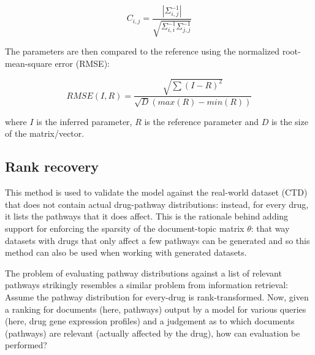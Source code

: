 \documentclass[12pt,a4paper,twoside,openright]{report}
\begin{document}
\begin{equation}
C_{i, j} = \frac{|\Sigma^{-1}_{i, j}|}{\sqrt{\Sigma^{-1}_{i, i}\Sigma^{-1}_{j, j}}}
\end{equation}

The parameters are then compared to the reference using the normalized root-mean-square error (RMSE):

\begin{equation}
\mathit{RMSE}(I, R) = \frac{\sqrt{\sum{(I-R)^2}}}{\sqrt{D}(max(R) - min(R))}
\end{equation}

where $I$ is the inferred parameter, $R$ is the reference parameter and $D$ is the size of the matrix/vector.

%
%

\subsection{Rank recovery}

This method is used to validate the model against the real-world dataset (CTD) that does not contain actual drug-pathway distributions: instead, for every drug, it lists the pathways that it does affect. This is the rationale behind adding support for enforcing the sparsity of the document-topic matrix $\theta$: that way datasets with drugs that only affect a few pathways can be generated and so this method can also be used when working with generated datasets.

The problem of evaluating pathway distributions against a list of relevant pathways strikingly resembles a similar problem from information retrieval: Assume the pathway distribution for every-drug is rank-transformed. Now, given a ranking for documents (here, pathways) output by a model for various queries (here, drug gene expression profiles) and a judgement as to which documents (pathways) are relevant (actually affected by the drug), how can evaluation be performed?
\end{document}
